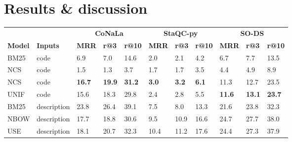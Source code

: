\documentclass[12pt,conference, onecolumn]{IEEEtran}
\begin{document}
\section{Results \& discussion} \label{sec:results}
\begin{table}[]
\centering
\small
\begin{tabular}{@{}lllllllllll@{}}
\toprule
\textbf{}       & \textbf{}       & \multicolumn{3}{c}{\textbf{CoNaLa}} & \multicolumn{3}{c}{\textbf{StaQC-py}} & \multicolumn{3}{c}{\textbf{SO-DS}} \\ \cmidrule(l){3-5}  \cmidrule(l){6-8}  \cmidrule(l){9-11} 
\textbf{Model}           & \textbf{Inputs} & \textbf{MRR}        & \textbf{r@3 }       & \textbf{r@10 }     & \textbf{MRR}         & \textbf{r@3}       & \textbf{r@10}       & \textbf{MRR}        & \textbf{r@3}       & \textbf{r@10}      \\ \midrule
BM25      & code            & 6.9        & 7.0        & 14.6      & 2.0         & 2.1        & 4.2        & 6.7        & 7.7       & 13.5      \\
NCS       & code            & 1.5                              & 1.3                              & 3.7                               & 1.7                              & 1.7                              & 3.5                               & 4.4                              & 4.9                              & 8.9                               \\
NCS      & code               & \textbf{16.7}                    & \textbf{19.9}                    & \textbf{31.2}                     & \textbf{3.0}                     & \textbf{3.2}                     & \textbf{6.1}                      & 11.3                    & 12.7                    & 23.5                     \\ 
UNIF            & code            & 15.6       & 18.3       & 29.8      & 2.4        & 2.8        & 5.5        &    \textbf{11.6}        &     \textbf{13.1}      &    \textbf{23.7}       \\ \midrule
BM25     & description     & 23.8       & 26.4       & 39.1      & 7.5         & 8.0        & 13.3       & 21.6       & 23.8      & 32.3      \\
NBOW            & description     & 17.7       & 18.8       & 30.6      & 9.5         & 10.9       & 16.6       & 24.7       & 27.7      & 38.0      \\
USE             & description     & 18.1       & 20.7       & 32.3      & 10.4        & 11.2       & 17.6       & 24.4       & 27.3      & 37.9      \\

\end{tabular}
\end{table}
\end{document}
